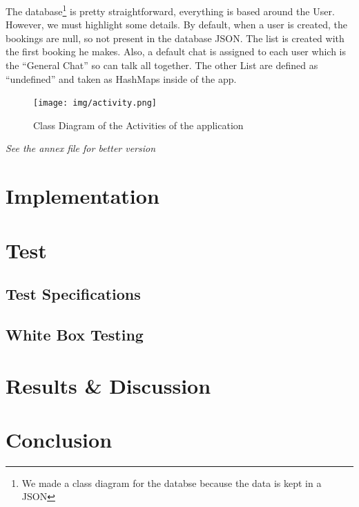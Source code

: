 \documentclass[paper=a4, fontsize=12pt,DIV=14]{scrartcl}    %
\begin{document}
The database\footnote{We made a class diagram for the databse because the data is kept in a JSON} is pretty straightforward, everything is based around the User. However, we must highlight some details. By default, when a user is created, the bookings are null, so not present in the database JSON. The list is created with the first booking he makes.
Also, a default chat is assigned to each user which is the “General Chat” so can talk all together. The other List are defined as “undefined” and taken as HashMaps inside of the app.



\newpage


\begin{figure}[!htbp]
							\center
		                    \texttt{[image: img/activity.png]}
		                    \caption{Class Diagram of the Activities of the application} 

\end{figure}
\textit{See the annex file for better version}




    \newpage
        \section{Implementation}



    \newpage
        \section{Test}
        	\subsection{Test Specifications}
        	\subsection{White Box Testing}



    \newpage
        \section{Results \& Discussion}



    \newpage
        \section{Conclusion}



\end{document}
